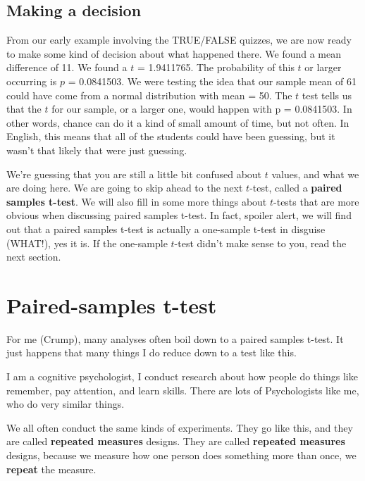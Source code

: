 \documentclass[
]{book}
\begin{document}
\hypertarget{making-a-decision}{%
\subsection{Making a decision}\label{making-a-decision}}

From our early example involving the TRUE/FALSE quizzes, we are now ready to make some kind of decision about what happened there. We found a mean difference of 11. We found a \(t\) = 1.9411765. The probability of this \(t\) or larger occurring is \(p\) = 0.0841503. We were testing the idea that our sample mean of 61 could have come from a normal distribution with mean = 50. The \(t\) test tells us that the \(t\) for our sample, or a larger one, would happen with p = 0.0841503. In other words, chance can do it a kind of small amount of time, but not often. In English, this means that all of the students could have been guessing, but it wasn't that likely that were just guessing.

We're guessing that you are still a little bit confused about \(t\) values, and what we are doing here. We are going to skip ahead to the next \(t\)-test, called a \textbf{paired samples t-test}. We will also fill in some more things about \(t\)-tests that are more obvious when discussing paired samples t-test. In fact, spoiler alert, we will find out that a paired samples t-test is actually a one-sample t-test in disguise (WHAT!), yes it is. If the one-sample \(t\)-test didn't make sense to you, read the next section.

\hypertarget{paired-samples-t-test}{%
\section{Paired-samples t-test}\label{paired-samples-t-test}}

For me (Crump), many analyses often boil down to a paired samples t-test. It just happens that many things I do reduce down to a test like this.

I am a cognitive psychologist, I conduct research about how people do things like remember, pay attention, and learn skills. There are lots of Psychologists like me, who do very similar things.

We all often conduct the same kinds of experiments. They go like this, and they are called \textbf{repeated measures} designs. They are called \textbf{repeated measures} designs, because we measure how one person does something more than once, we \textbf{repeat} the measure.
\end{document}
